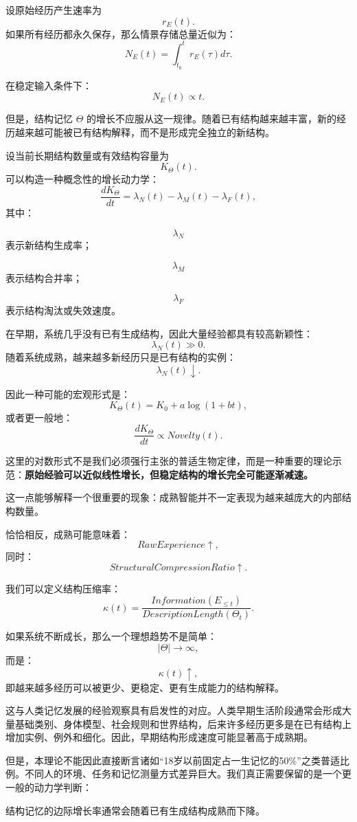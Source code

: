设原始经历产生速率为
\[
r_E(t).
\]
如果所有经历都永久保存，那么情景存储总量近似为：
\[
N_E(t)
=
\int_{t_0}^{t}
r_E(\tau)d\tau.
\]

在稳定输入条件下：
\[
N_E(t)\propto t.
\]

但是，结构记忆 \(\Theta\) 的增长不应服从这一规律。随着已有结构越来越丰富，新的经历越来越可能被已有结构解释，而不是形成完全独立的新结构。

设当前长期结构数量或有效结构容量为
\[
K_\Theta(t).
\]
可以构造一种概念性的增长动力学：
\[
\frac{dK_\Theta}{dt}
=
\lambda_N(t)
-
\lambda_M(t)
-
\lambda_F(t),
\]
其中：

\[
\lambda_N
\]
表示新结构生成率；

\[
\lambda_M
\]
表示结构合并率；

\[
\lambda_F
\]
表示结构淘汰或失效速度。

在早期，系统几乎没有已有生成结构，因此大量经验都具有较高新颖性：
\[
\lambda_N(t)\gg0.
\]
随着系统成熟，越来越多新经历只是已有结构的实例：
\[
\lambda_N(t)\downarrow.
\]

因此一种可能的宏观形式是：
\[
K_\Theta(t)
=
K_0
+
a\log(1+bt),
\]
或者更一般地：
\[
\frac{dK_\Theta}{dt}
\propto
Novelty(t).
\]

这里的对数形式不是我们必须强行主张的普适生物定律，而是一种重要的理论示范：\textbf{原始经验可以近似线性增长，但稳定结构的增长完全可能逐渐减速。}

这一点能够解释一个很重要的现象：成熟智能并不一定表现为越来越庞大的内部结构数量。

恰恰相反，成熟可能意味着：
\[
RawExperience\uparrow,
\]
同时：
\[
StructuralCompressionRatio\uparrow.
\]

我们可以定义结构压缩率：
\[
\kappa(t)
=
\frac{
Information(E_{\leq t})
}{
DescriptionLength(\Theta_t)
}.
\]

如果系统不断成长，那么一个理想趋势不是简单：
\[
|\Theta|\rightarrow\infty,
\]
而是：
\[
\kappa(t)\uparrow,
\]
即越来越多经历可以被更少、更稳定、更有生成能力的结构解释。

这与人类记忆发展的经验观察具有启发性的对应。人类早期生活阶段通常会形成大量基础类别、身体模型、社会规则和世界结构，后来许多经历更多是在已有结构上增加实例、例外和细化。因此，早期结构形成速度可能显著高于成熟期。

但是，本理论不能因此直接断言诸如“18岁以前固定占一生记忆的50\%”之类普适比例。不同人的环境、任务和记忆测量方式差异巨大。我们真正需要保留的是一个更一般的动力学判断：

\begin{proposition*}
结构记忆的边际增长率通常会随着已有生成结构成熟而下降。
\end{proposition*}

